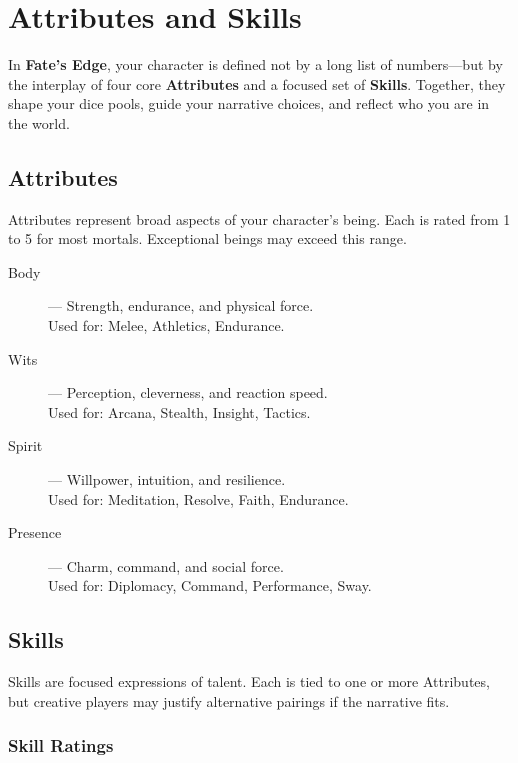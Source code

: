 
\chapter{Attributes and Skills}

In \textbf{Fate’s Edge}, your character is defined not by a long list of numbers—but by the interplay of four core \textbf{Attributes} and a focused set of \textbf{Skills}. Together, they shape your dice pools, guide your narrative choices, and reflect who you are in the world.

\section{Attributes}

Attributes represent broad aspects of your character’s being. Each is rated from 1 to 5 for most mortals. Exceptional beings may exceed this range.

\begin{description}
  \item[Body] — Strength, endurance, and physical force. \\
    Used for: Melee, Athletics, Endurance.

  \item[Wits] — Perception, cleverness, and reaction speed. \\
    Used for: Arcana, Stealth, Insight, Tactics.

  \item[Spirit] — Willpower, intuition, and resilience. \\
    Used for: Meditation, Resolve, Faith, Endurance.

  \item[Presence] — Charm, command, and social force. \\
    Used for: Diplomacy, Command, Performance, Sway.
\end{description}

\section{Skills}

Skills are focused expressions of talent. Each is tied to one or more Attributes, but creative players may justify alternative pairings if the narrative fits.

\subsection*{Skill Ratings}

